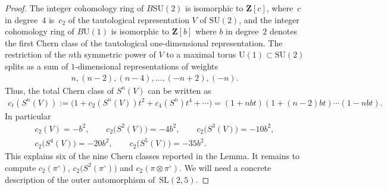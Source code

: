 \documentclass[pdftex]{sigma}
\numberwithin{equation}{section}
\newcommand\bZ{\mathbf Z}
\newcommand\<\langle
\renewcommand\>\rangle
\newcommand\SU{\mathrm{SU}}
\newcommand{\SL}{\mathrm{SL}}
\begin{document}
\begin{proof}The integer cohomology ring of $B\SU(2)$ is isomorphic to $\bZ[c]$, where~$c$ in degree~$4$ is~$c_2$ of the tautological representation $V$ of $\SU(2)$, and the integer cohomology ring of $B\mathrm{U}(1)$ is isomorphic to $\bZ[b]$ where $b$ in degree~$2$ denotes the first Chern class of the tautological one-dimensional representation. The restriction of the $n$th symmetric power of $V$ to a maximal torus $\mathrm{U}(1) \subset \mathrm{SU}(2)$ splits as a sum of $1$-dimensional representations of weights
\begin{gather*}
n, (n-2),(n-4),\ldots,(-n+2),(-n).
\end{gather*}
Thus, the total Chern class of $S^n(V)$ can be written as
\begin{gather*}
c_t(S^n(V)) := \big(1+c_2(S^n(V))t^2 + c_4(S^n)t^4 + \cdots\big) = (1+nbt)(1+(n-2)bt)\cdots(1-nbt).
\end{gather*}
In particular
\begin{gather*}
c_2(V) = -b^2, \qquad c_2\big(S^2(V)\big) = -4b^2, \qquad c_2\big(S^3(V)\big) =-10b^2, \\ c_2\big(S^4(V)\big) = -20b^2, \qquad c_2\big(S^5(V)\big) = -35b^2.
\end{gather*}
This explains six of the nine Chern classes reported in the Lemma. It remains to compute $c_2(\pi^\circ)$, $c_2\big(S^2(\pi^\circ)\big)$ and $c_2(\pi \otimes \pi^\circ)$. We will need a concrete description of the outer automorphism of~$\SL(2,5)$.


\end{proof}
\end{document}
